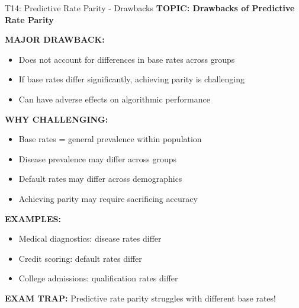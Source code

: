 \documentclass[8pt]{beamer}
\begin{document}
	\begin{frame}{T14: Predictive Rate Parity - Drawbacks}
		\fontsize{6.5}{7.5}\selectfont
		\textbf{TOPIC: Drawbacks of Predictive Rate Parity}
		
		\vspace{0.1cm}
		\textbf{MAJOR DRAWBACK:}
		\begin{itemize}
			\item Does not account for differences in base rates across groups
			\item If base rates differ significantly, achieving parity is challenging
			\item Can have adverse effects on algorithmic performance
		\end{itemize}
		
		\vspace{0.1cm}
		\textbf{WHY CHALLENGING:}
		\begin{itemize}
			\item Base rates = general prevalence within population
			\item Disease prevalence may differ across groups
			\item Default rates may differ across demographics
			\item Achieving parity may require sacrificing accuracy
		\end{itemize}
		
		\vspace{0.1cm}
		\textbf{EXAMPLES:}
		\begin{itemize}
			\item Medical diagnostics: disease rates differ
			\item Credit scoring: default rates differ
			\item College admissions: qualification rates differ
		\end{itemize}
		
		\textcolor{myred}{\textbf{EXAM TRAP:}} Predictive rate parity struggles with \textcolor{myblue}{different base rates}!
	\end{frame}
	
\end{document}
